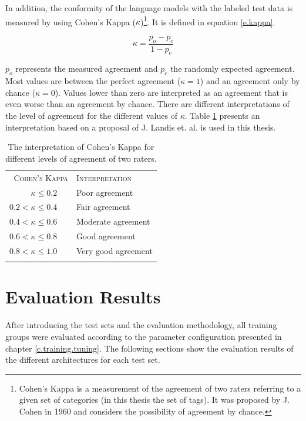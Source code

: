 In addition, the conformity of the language models with the labeled test data is measured by using Cohen's Kappa ($\kappa$)\footnote{Cohen's Kappa is a measurement of the agreement of two raters referring to a given set of categories (in this thesis the set of tags). It was proposed by J. Cohen in 1960 \cite{cohen1960} and considers the possibility of agreement by chance.}. It is defined in equation \ref{e.kappa}.

\begin{equation}
\kappa = \frac{p_o - p_c}{1 - p_c} \label{e.kappa}
\end{equation}

$p_o$ represents the measured agreement and $p_c$ the randomly expected agreement. Most values are between the perfect agreement ($\kappa = 1$) and an agreement only by chance ($\kappa = 0$). Values lower than zero are interpreted as an agreement that is even worse than an agreement by chance. There are different interpretations of the level of agreement for the different values of $\kappa$. Table \ref{t.evaluation.kappa} presents an interpretation based on a proposal of J. Landis et. al. \cite{landis1977} is used in this thesis.

\begin{table}[!ht]
	\centering\small{}\begin{tabular}{ r l }
	\trule
	\textsc{Cohen's Kappa} & \textsc{Interpretation} \\
	\srule
	$\kappa \leq 0.2$ \ \ & Poor agreement \\
	\mrule
	$0.2 < \kappa \leq 0.4$ \ \ & Fair agreement \\
	\mrule
	$0.4 < \kappa \leq 0.6$ \ \ & Moderate agreement \\
	\mrule
	$0.6 < \kappa \leq 0.8$ \ \ & Good agreement \\
	\mrule
	$0.8 < \kappa \leq 1.0$ \ \ & Very good agreement \\
	\brule
	\end{tabular}
	\vspace{.8em}
	\caption[Interpretation of Cohen's Kappa]{The interpretation of Cohen's Kappa for different levels of agreement of two raters.}
	\label{t.evaluation.kappa}
\end{table}

\section{Evaluation Results}\label{c.evaluation.results}
After introducing the test sets and the evaluation methodology, all training groups were evaluated according to the parameter configuration presented in chapter \ref{c.training.tuning}. The following sections show the evaluation results of the different architectures for each test set.

